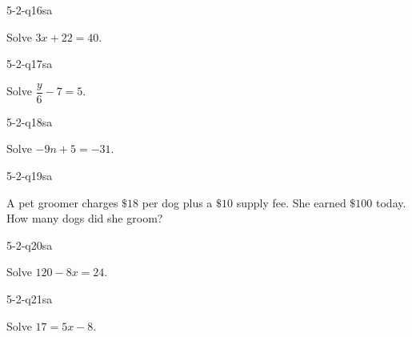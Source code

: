
\begin{practiceQuestion}{5-2-q16}{sa}
\begin{questionText}
Solve $3x + 22 = 40$.
\end{questionText}
\end{practiceQuestion}

\begin{practiceQuestion}{5-2-q17}{sa}
\begin{questionText}
Solve $\dfrac{y}{6} - 7 = 5$.
\end{questionText}
\end{practiceQuestion}

\begin{practiceQuestion}{5-2-q18}{sa}
\begin{questionText}
Solve $-9n + 5 = -31$.
\end{questionText}
\end{practiceQuestion}

\begin{practiceQuestion}{5-2-q19}{sa}
\begin{questionText}
A pet groomer charges $\$18$ per dog plus a $\$10$ supply fee. She earned $\$100$ today. How many dogs did she groom?
\end{questionText}
\end{practiceQuestion}

\begin{practiceQuestion}{5-2-q20}{sa}
\begin{questionText}
Solve $120 - 8x = 24$.
\end{questionText}
\end{practiceQuestion}

\begin{practiceQuestion}{5-2-q21}{sa}
\begin{questionText}
Solve $17 = 5x - 8$.
\end{questionText}
\end{practiceQuestion}

